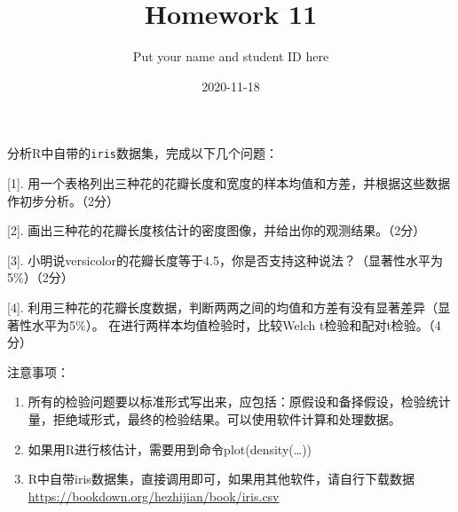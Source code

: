\documentclass[]{article}
\title{Homework 11}
\author{Put your name and student ID here}
\date{2020-11-18}
\begin{document}
\maketitle

分析R中自带的\texttt{iris}数据集，完成以下几个问题：

{[}1{]}.
用一个表格列出三种花的花瓣长度和宽度的样本均值和方差，并根据这些数据作初步分析。（2分）

{[}2{]}.
画出三种花的花瓣长度核估计的密度图像，并给出你的观测结果。（2分）

{[}3{]}.
小明说versicolor的花瓣长度等于4.5，你是否支持这种说法？（显著性水平为5\%）（2分）

{[}4{]}.
利用三种花的花瓣长度数据，判断两两之间的均值和方差有没有显著差异（显著性水平为5\%）。
在进行两样本均值检验时，比较Welch t检验和配对t检验。（4分）

注意事项：

\begin{enumerate}
\def\labelenumi{\arabic{enumi}.}
\item
  所有的检验问题要以标准形式写出来，应包括：原假设和备择假设，检验统计量，拒绝域形式，最终的检验结果。可以使用软件计算和处理数据。
\item
  如果用R进行核估计，需要用到命令plot(density(\ldots))
\item
  R中自带iris数据集，直接调用即可，如果用其他软件，请自行下载数据
  \url{https://bookdown.org/hezhijian/book/iris.csv}
\end{enumerate}
\end{document}
